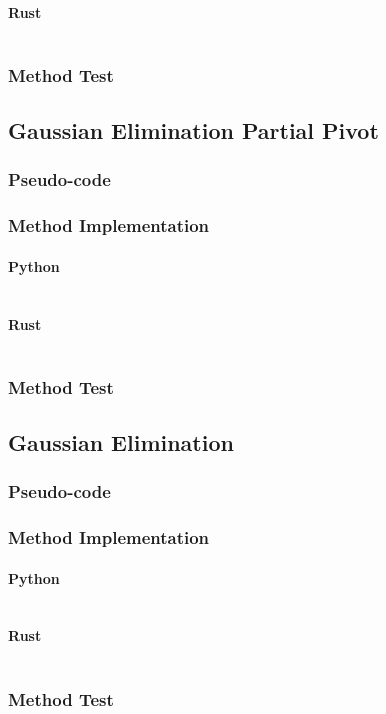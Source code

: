 \documentclass{article}
\begin{document}
            \paragraph{Rust}
                \begin{verbatim}
                \end{verbatim}
        \subsubsection{Method Test}

    \subsection{Gaussian Elimination Partial Pivot}
        \subsubsection{Pseudo-code}
        \subsubsection{Method Implementation}
            \paragraph{Python}
                \begin{verbatim}
                \end{verbatim}
            \paragraph{Rust}
                \begin{verbatim}
                \end{verbatim}
        \subsubsection{Method Test}

    \subsection{Gaussian Elimination}
        \subsubsection{Pseudo-code}
        \subsubsection{Method Implementation}
            \paragraph{Python}
                \begin{verbatim}
                \end{verbatim}
            \paragraph{Rust}
                \begin{verbatim}
                \end{verbatim}
        \subsubsection{Method Test}
\end{document}
